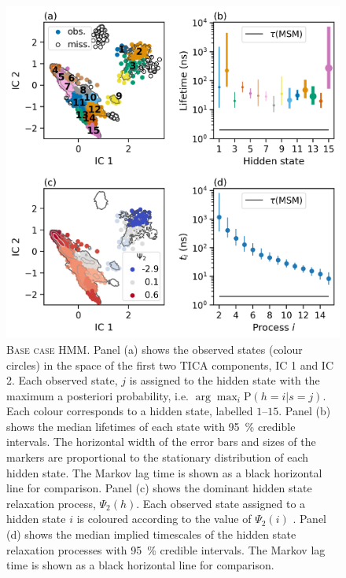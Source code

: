 \begin{figure}
    \centering
    \includegraphics{chapters/aadh/figures/base_case_hmm.png}
    \caption[Base case HMM]{\textsc{Base case HMM}. Panel (a) shows the observed states (colour circles) in the space of the first two TICA components, IC 1 and IC 2. Each observed state, $j$ is assigned to the hidden state with the maximum a posteriori probability, i.e.  $\arg \max_{i} \mathrm{P}(h=i|s=j)$. Each colour corresponds to a hidden state, labelled $\numrange[range-phrase=\text{--}]{1}{15}$. Panel (b) shows the median lifetimes of each state with \SI{95}{\percent} credible intervals. The horizontal width of the error bars and sizes of the markers are proportional to the stationary distribution of each hidden state. The Markov lag time is shown as a black horizontal line for comparison. Panel (c) shows the dominant hidden state relaxation process, $\Psi_{2}(h)$. Each observed state assigned to a hidden state $i$ is coloured according to the value of $\Psi_{2}(i)$ . Panel (d) shows the median implied timescales of the hidden state relaxation processes with \SI{95}{\percent} credible intervals. The Markov lag time is shown as a black horizontal line for comparison.}
    \label{fig:base_case_hmm}
\end{figure}

